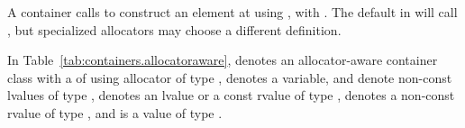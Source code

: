 \begin{note}
A container calls 
to construct an element at  using ,
with .
The default  in  will
call ,
but specialized allocators may choose a different definition.
\end{note}

\pnum
In Table~\ref{tab:containers.allocatoraware},  denotes an allocator-aware container class
with a  of  using allocator of type ,  denotes a
variable,
 and  denote non-const lvalues of type ,
 denotes an lvalue or a const rvalue of type ,  denotes a
non-const rvalue of type , and  is a value of type .

